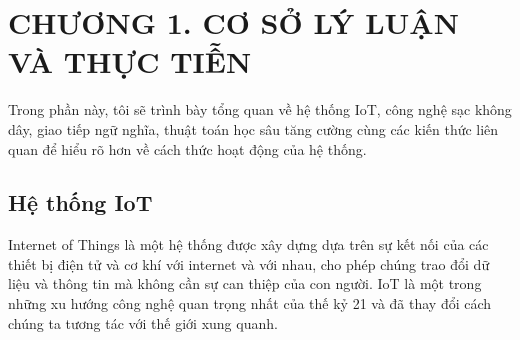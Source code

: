 \documentclass{article} %
\renewcommand{\contentsname}{TABLE OF CONTENTS}
\renewcommand{\listtablename}{LIST OF TABLES}
\begin{document}

% 




 \renewcommand{\contentsname}{MỤC LỤC}

\tableofcontents 
\thispagestyle{empty}
\cleardoublepage


\renewcommand{\listtablename}{DANH MỤC HÌNH}
{\let\oldnumberline\numberline
\renewcommand{\numberline}{Hình~\oldnumberline}
\listoffigures} 
\newpage

 \renewcommand{\listtablename}{DANH SÁCH BẢNG}
{\let\oldnumberline\numberline
\renewcommand{\numberline}{Table~\oldnumberline}
\listoftables}
\newpage



\section*{CHƯƠNG 1.  CƠ SỞ LÝ LUẬN VÀ THỰC TIỄN}
\setcounter{section}{1}
\setcounter{figure}{0}
\setcounter{table}{0}

Trong phần này, tôi sẽ trình bày tổng quan về hệ thống IoT, công nghệ sạc không dây, giao tiếp ngữ nghĩa, thuật toán học sâu tăng cường cùng các kiến thức liên quan để hiểu rõ hơn về cách thức hoạt động của hệ thống.
\subsection{Hệ thống IoT}
Internet of Things \cite{iot_kn} là một hệ thống được xây dựng dựa trên sự kết nối của các thiết bị điện tử và cơ khí với internet và với nhau, cho phép chúng trao đổi dữ liệu và thông tin mà không cần sự can thiệp của con người. IoT là một trong những xu hướng công nghệ quan trọng nhất của thế kỷ 21 và đã thay đổi cách chúng ta tương tác với thế giới xung quanh.
\end{document}
